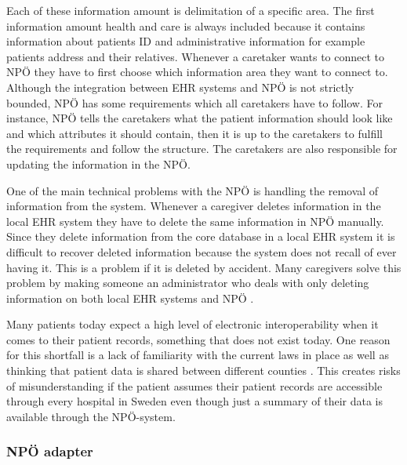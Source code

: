 \documentclass[14pt]{article}
\begin{document}
Each of these information amount is delimitation of a specific area. The first information amount health and care is always included because it contains information about patients ID and administrative information for example patients address and their relatives. Whenever a caretaker wants to connect to NPÖ they have to first choose which information area they want to connect to. Although the integration between \gls{EHR} systems and NPÖ is not strictly bounded, NPÖ has some requirements which all caretakers have to follow. For instance, NPÖ tells the caretakers what the patient information should look like and which attributes it should contain, then it is up to the caretakers to fulfill the requirements and follow the structure. The caretakers are also responsible for updating the information in the NPÖ. 

One of the main technical problems with the NPÖ is handling the removal of information from the system. Whenever a caregiver deletes information in the local \gls{EHR} system they have to delete the same information in NPÖ manually. Since they delete information from the core database in a local \gls{EHR} system it is difficult to recover deleted information because the system does not recall of ever having it. This is a problem if it is deleted by accident. Many caregivers solve this problem by making someone an administrator who deals with only deleting information on both local \gls{EHR} systems and NPÖ  \cite{ViktorJernelov}.

Many patients today expect a high level of electronic \gls{interoperability} when it comes to their patient records\cite{EPJ2}, something that does not exist today. One reason for this shortfall is a lack of familiarity with the current laws in place as well as thinking that patient data is shared between different counties \cite{EPJ2}. This creates risks of misunderstanding if the patient assumes their patient records are accessible through every hospital in Sweden even though just a summary of their data is available through the NPÖ-system.
\label{sec:npoInterv}
\subsubsection{NPÖ adapter}
\label{sec:npoIntervi}
\end{document}
